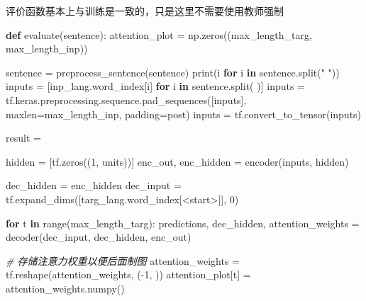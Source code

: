 \documentclass[
]{article}
\newenvironment{Shaded}{}{}
\newcommand{\BuiltInTok}[1]{#1}
\newcommand{\CommentTok}[1]{\textcolor[rgb]{0.38,0.63,0.69}{\textit{#1}}}
\newcommand{\ControlFlowTok}[1]{\textcolor[rgb]{0.00,0.44,0.13}{\textbf{#1}}}
\newcommand{\DecValTok}[1]{\textcolor[rgb]{0.25,0.63,0.44}{#1}}
\newcommand{\KeywordTok}[1]{\textcolor[rgb]{0.00,0.44,0.13}{\textbf{#1}}}
\newcommand{\NormalTok}[1]{#1}
\newcommand{\OperatorTok}[1]{\textcolor[rgb]{0.40,0.40,0.40}{#1}}
\newcommand{\StringTok}[1]{\textcolor[rgb]{0.25,0.44,0.63}{#1}}
\begin{document}
评价函数基本上与训练是一致的，只是这里不需要使用教师强制

\begin{Shaded}
\begin{Highlighting}[]
\KeywordTok{def}\NormalTok{ evaluate(sentence):}
\NormalTok{    attention\_plot }\OperatorTok{=}\NormalTok{ np.zeros((max\_length\_targ, max\_length\_inp))}

\NormalTok{    sentence }\OperatorTok{=}\NormalTok{ preprocess\_sentence(sentence)}
    \BuiltInTok{print}\NormalTok{(i }\ControlFlowTok{for}\NormalTok{ i }\KeywordTok{in}\NormalTok{ sentence.split(}\StringTok{" "}\NormalTok{))}
\NormalTok{    inputs }\OperatorTok{=}\NormalTok{ [inp\_lang.word\_index[i] }
              \ControlFlowTok{for}\NormalTok{ i }\KeywordTok{in}\NormalTok{ sentence.split(}\StringTok{\textquotesingle{} \textquotesingle{}}\NormalTok{)]}
\NormalTok{    inputs }\OperatorTok{=}\NormalTok{ tf.keras.preprocessing.sequence.pad\_sequences([inputs],}
\NormalTok{                                                           maxlen}\OperatorTok{=}\NormalTok{max\_length\_inp,}
\NormalTok{                                                           padding}\OperatorTok{=}\StringTok{\textquotesingle{}post\textquotesingle{}}\NormalTok{)}
\NormalTok{    inputs }\OperatorTok{=}\NormalTok{ tf.convert\_to\_tensor(inputs)}

\NormalTok{    result }\OperatorTok{=} \StringTok{\textquotesingle{}\textquotesingle{}}

\NormalTok{    hidden }\OperatorTok{=}\NormalTok{ [tf.zeros((}\DecValTok{1}\NormalTok{, units))]}
\NormalTok{    enc\_out, enc\_hidden }\OperatorTok{=}\NormalTok{ encoder(inputs, hidden)}

\NormalTok{    dec\_hidden }\OperatorTok{=}\NormalTok{ enc\_hidden}
\NormalTok{    dec\_input }\OperatorTok{=}\NormalTok{ tf.expand\_dims([targ\_lang.word\_index[}\StringTok{\textquotesingle{}\textless{}start\textgreater{}\textquotesingle{}}\NormalTok{]], }\DecValTok{0}\NormalTok{)}

    \ControlFlowTok{for}\NormalTok{ t }\KeywordTok{in} \BuiltInTok{range}\NormalTok{(max\_length\_targ):}
\NormalTok{        predictions, dec\_hidden, attention\_weights }\OperatorTok{=}\NormalTok{ decoder(dec\_input,}
\NormalTok{                                                             dec\_hidden,}
\NormalTok{                                                             enc\_out)}

        \CommentTok{\# 存储注意力权重以便后面制图}
\NormalTok{        attention\_weights }\OperatorTok{=}\NormalTok{ tf.reshape(attention\_weights, (}\OperatorTok{{-}}\DecValTok{1}\NormalTok{, ))}
\NormalTok{        attention\_plot[t] }\OperatorTok{=}\NormalTok{ attention\_weights.numpy()}


\end{Highlighting}
\end{Shaded}
\end{document}
